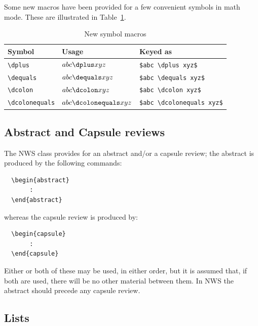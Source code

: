 \documentclass{article}
\begin{document}
Some new macros have been provided for a few convenient symbols in
math mode.  These are illustrated in Table~\ref{newcommands}.
\ifprodtf\newpage\fi

\begin{table}
\caption{New symbol macros}\label{newcommands}
\programmath
\begin{tabular}{lll}
\hline\hline
Symbol                & Usage                  & Keyed as\\
\hline
\verb"\dplus"         & $abc \dplus xyz$         & \verb"$abc \dplus xyz$"\\
\verb"\dequals"       & $abc \dequals xyz$       & \verb"$abc \dequals xyz$"\\
\verb"\dcolon"        & $abc \dcolon xyz$        & \verb"$abc \dcolon xyz$"\\
\verb"\dcolonequals"  & $abc \dcolonequals xyz$  & \verb"$abc \dcolonequals xyz$"\\
\hline\hline
\end{tabular}
\unprogrammath
\end{table}

\subsection{Abstract and Capsule reviews}

The NWS class provides for an abstract and/or a capsule review; the
abstract is produced by the following commands:
%
\begin{verbatim}
  \begin{abstract}
       :
  \end{abstract}
\end{verbatim}
%
whereas the capsule review is produced by:
%
\begin{verbatim}
  \begin{capsule}
       :
  \end{capsule}
\end{verbatim}
%
Either or both of these may be used, in either order, but it is assumed
that, if both are used, there will be no other material between them.
In NWS the abstract should precede any capsule review.

\subsection{Lists}
\end{document}
